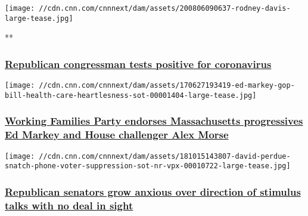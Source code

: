 \href{/videos/politics/2020/08/06/rodney-davis-illinois-tests-positive-coronavirus-newday-intv-vpx.cnn}{}

\texttt{[image: //cdn.cnn.com/cnnnext/dam/assets/200806090637-rodney-davis-large-tease.jpg]}

**

\hypertarget{republican-congressman-tests-positive-for-coronavirus-}{%
\subsubsection{\texorpdfstring{\href{/videos/politics/2020/08/06/rodney-davis-illinois-tests-positive-coronavirus-newday-intv-vpx.cnn}{Republican
congressman tests positive for coronavirus
}}{Republican congressman tests positive for coronavirus }}\label{republican-congressman-tests-positive-for-coronavirus-}}

\href{/2020/08/06/politics/working-families-party-ed-markey-alex-morse/index.html}{}

\texttt{[image: //cdn.cnn.com/cnnnext/dam/assets/170627193419-ed-markey-gop-bill-health-care-heartlesness-sot-00001404-large-tease.jpg]}

\hypertarget{working-families-party-endorses-massachusetts-progressives-ed-markey-and-house-challenger-alex-morse}{%
\subsubsection{\texorpdfstring{\href{/2020/08/06/politics/working-families-party-ed-markey-alex-morse/index.html}{Working
Families Party endorses Massachusetts progressives Ed Markey and House
challenger Alex
Morse}}{Working Families Party endorses Massachusetts progressives Ed Markey and House challenger Alex Morse}}\label{working-families-party-endorses-massachusetts-progressives-ed-markey-and-house-challenger-alex-morse}}

\href{/2020/08/05/politics/republicans-stimulus-negotiations/index.html}{}

\texttt{[image: //cdn.cnn.com/cnnnext/dam/assets/181015143807-david-perdue-snatch-phone-voter-suppression-sot-nr-vpx-00010722-large-tease.jpg]}

\hypertarget{republican-senators-grow-anxious-over-direction-of-stimulus-talks-with-no-deal-in-sight}{%
\subsubsection{\texorpdfstring{\href{/2020/08/05/politics/republicans-stimulus-negotiations/index.html}{Republican
senators grow anxious over direction of stimulus talks with no deal in
sight}}{Republican senators grow anxious over direction of stimulus talks with no deal in sight}}\label{republican-senators-grow-anxious-over-direction-of-stimulus-talks-with-no-deal-in-sight}}

